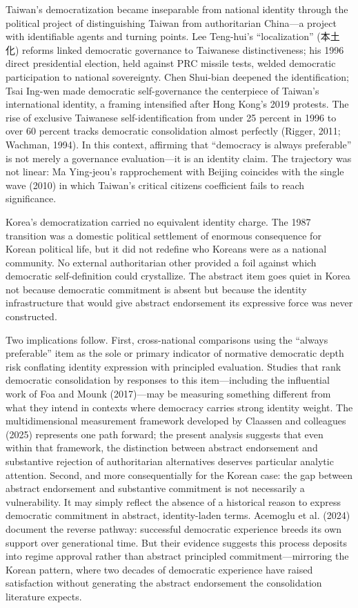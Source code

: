 \documentclass[
  12pt,
  12pt,
  letterpaper]{article}
\begin{document}
Taiwan's democratization became inseparable from national identity
through the political project of distinguishing Taiwan from
authoritarian China---a project with identifiable agents and turning
points. Lee Teng-hui's ``localization'' (本土化) reforms linked
democratic governance to Taiwanese distinctiveness; his 1996 direct
presidential election, held against PRC missile tests, welded democratic
participation to national sovereignty. Chen Shui-bian deepened the
identification; Tsai Ing-wen made democratic self-governance the
centerpiece of Taiwan's international identity, a framing intensified
after Hong Kong's 2019 protests. The rise of exclusive Taiwanese
self-identification from under 25 percent in 1996 to over 60 percent
tracks democratic consolidation almost perfectly (Rigger, 2011; Wachman,
1994). In this context, affirming that ``democracy is always
preferable'' is not merely a governance evaluation---it is an identity
claim. The trajectory was not linear: Ma Ying-jeou's rapprochement with
Beijing coincides with the single wave (2010) in which Taiwan's critical
citizens coefficient fails to reach significance.

Korea's democratization carried no equivalent identity charge. The 1987
transition was a domestic political settlement of enormous consequence
for Korean political life, but it did not redefine who Koreans were as a
national community. No external authoritarian other provided a foil
against which democratic self-definition could crystallize. The abstract
item goes quiet in Korea not because democratic commitment is absent but
because the identity infrastructure that would give abstract endorsement
its expressive force was never constructed.

Two implications follow. First, cross-national comparisons using the
``always preferable'' item as the sole or primary indicator of normative
democratic depth risk conflating identity expression with principled
evaluation. Studies that rank democratic consolidation by responses to
this item---including the influential work of Foa and Mounk (2017)---may
be measuring something different from what they intend in contexts where
democracy carries strong identity weight. The multidimensional
measurement framework developed by Claassen and colleagues (2025)
represents one path forward; the present analysis suggests that even
within that framework, the distinction between abstract endorsement and
substantive rejection of authoritarian alternatives deserves particular
analytic attention. Second, and more consequentially for the Korean
case: the gap between abstract endorsement and substantive commitment is
not necessarily a vulnerability. It may simply reflect the absence of a
historical reason to express democratic commitment in abstract,
identity-laden terms. Acemoglu et al. (2024) document the reverse
pathway: successful democratic experience breeds its own support over
generational time. But their evidence suggests this process deposits
into regime approval rather than abstract principled
commitment---mirroring the Korean pattern, where two decades of
democratic experience have raised satisfaction without generating the
abstract endorsement the consolidation literature expects.
\end{document}
